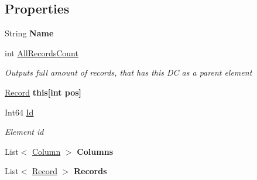 \subsection*{Properties}
\begin{DoxyCompactItemize}
\item 
\hypertarget{class_dwarf_d_b_1_1_data_structures_1_1_data_container_ac285de692141c079be1bce8dccebb859}{String {\bfseries Name}}\label{class_dwarf_d_b_1_1_data_structures_1_1_data_container_ac285de692141c079be1bce8dccebb859}

\item 
int \hyperlink{class_dwarf_d_b_1_1_data_structures_1_1_data_container_af2f2d766cbb2729f91effb3c68fd97e0}{All\+Records\+Count}
\begin{DoxyCompactList}\small\item\em Outputs full amount of records, that has this D\+C as a parent element \end{DoxyCompactList}\item 
\hypertarget{class_dwarf_d_b_1_1_data_structures_1_1_data_container_a8b12c9bac22fa5ad7d007267f06e20c1}{\hyperlink{class_dwarf_d_b_1_1_data_structures_1_1_record}{Record} {\bfseries this\mbox{[}int pos\mbox{]}}}\label{class_dwarf_d_b_1_1_data_structures_1_1_data_container_a8b12c9bac22fa5ad7d007267f06e20c1}

\item 
Int64 \hyperlink{class_dwarf_d_b_1_1_data_structures_1_1_data_container_a3749f4fe324b56d46caf071488c615d7}{Id}
\begin{DoxyCompactList}\small\item\em Element id \end{DoxyCompactList}\item 
\hypertarget{class_dwarf_d_b_1_1_data_structures_1_1_data_container_a4b7bab104009e416ea771276c2e7161a}{List$<$ \hyperlink{class_dwarf_d_b_1_1_data_structures_1_1_column}{Column} $>$ {\bfseries Columns}}\label{class_dwarf_d_b_1_1_data_structures_1_1_data_container_a4b7bab104009e416ea771276c2e7161a}

\item 
\hypertarget{class_dwarf_d_b_1_1_data_structures_1_1_data_container_a04e95f117bfb96a32811e7bfeb6c7c32}{List$<$ \hyperlink{class_dwarf_d_b_1_1_data_structures_1_1_record}{Record} $>$ {\bfseries Records}}\label{class_dwarf_d_b_1_1_data_structures_1_1_data_container_a04e95f117bfb96a32811e7bfeb6c7c32}

\end{DoxyCompactItemize}


